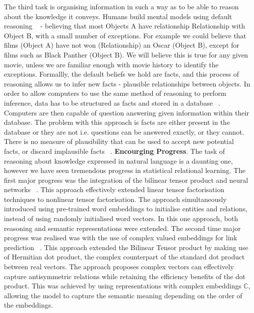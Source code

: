 The third task is organising information in such a way as to be able to reason about the knowledge it conveys. Humans build mental models using default reasoning ~\citep{reiter1980logic} - believing that most Objects A have relationship Relationship with Object B, with a small number of exceptions. For example we could believe that films (Object A) have not won (Relationship) an Oscar (Object B), except for films such as Black Panther (Object B). We will believe this is true for any given movie, unless we are familiar enough with movie history to identify the exceptions. Formallly, the default beliefs we hold are facts, and this process of reasoning allows us to infer new facts - plausible relationships between objects. In order to allow computers to use the same method of reasoning to perform inference, data has to be structured as facts and stored in a database ~\citep{angeli2013philosophers}. Computers are then capable of question answering given information within their database. The problem with this approach is facts are either present in the database or they are not i.e. questions can be answered exactly, or they cannot. There is no measure of plausibility that can be used to accept new potential facts, or discard implausible facts ~\citep{koller2007introduction}. \newline
\textbf{Encourging Progress}. The task of reasoning about knowledge expressed in natural language is a daunting one, however we have seen tremendous progress in statistical relational learning. The first major progress was the integration of the bilinear tensor product and neural networks ~\citep{socher2013reasoning}. This approach effectively extended linear tensor factorisation techniques to nonlinear tensor factorisation. The approach simultaneously introduced using pre-trained word embeddings to initialise entities and relations, instead of using randomly initialised word vectors. In this one approach, both reasoning and semantic representations were extended. \newline
The second time major progress was realised was with the use of complex valued embeddings for link prediction ~\citep{trouillon2016complex}. This approach extended the Bilinear Tensor product by making use of Hermitian dot product, the complex counterpart of the standard dot product between real vectors. The approach proposes complex vectors can effectively capture antisymmetric relations while retaining the efficiency benefits of the dot product. This was achieved by using representations with complex embeddings $\mathbb{C}$, allowing the model to capture the semantic meaning depending on the order of the embeddings. \newline 
